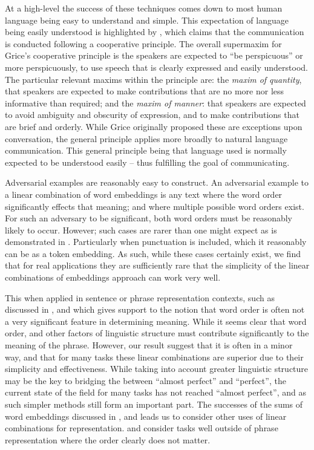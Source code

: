 \documentclass{book}
\begin{document}
At a high-level the success of these techniques comes down to most human language being easy to understand and simple.
This expectation of language being easily understood is highlighted by \citet{grice1975logic}, which claims that the communication is conducted following a cooperative principle.
The overall supermaxim for Grice's cooperative principle is the speakers are expected to ``be perspicuous'' or more perspicuously, to use speech that is clearly expressed and easily understood.
The particular relevant maxims within the principle are:
the \emph{maxim of quantity}, that speakers are expected to make contributions that are no more nor less informative than required;
and the \emph{maxim of manner}: that speakers are expected to avoid ambiguity and obscurity of expression, and to make contributions that are brief and orderly.
While Grice originally proposed these are exceptions upon conversation, the general principle applies more broadly to natural language communication.
This general principle being that language used is normally expected to be understood easily -- thus fulfilling the goal of communicating.


Adversarial examples are reasonably easy to construct.
An adversarial example to a linear combination of word embeddings is any text where the word order significantly effects that meaning;
and where multiple possible word orders exist.
For such an adversary to be significant, both word orders must be reasonably likely to occur.
However; such cases are rarer than one might expect  as is demonstrated in .
Particularly when punctuation is included, which it reasonably can be as a token embedding.
As such, while these cases certainly exist, we find that for real applications
they are sufficiently rare that the simplicity of the linear combinations of embeddings approach can work very well.


This when applied in sentence or phrase representation contexts,
such as discussed in , and 
which gives support to the notion that word order is often not a very significant feature in determining meaning.
While it seems clear that word order, and other factors of linguistic structure must contribute significantly to the meaning of the phrase.
However, our result suggest that it is often in a minor way, and that for many tasks these linear combinations are superior due to their simplicity and effectiveness.
While taking into account greater linguistic structure may be the key to bridging the between ``almost perfect'' and ``perfect'', the current state of the field for many tasks has not reached ``almost perfect'', and as such simpler methods still form an important part.
The successes of the sums of word embeddings discussed in , and  leads us to consider other uses of linear combinations for representation.
 and  consider tasks well outside of phrase representation where the order clearly does not matter.
\end{document}
